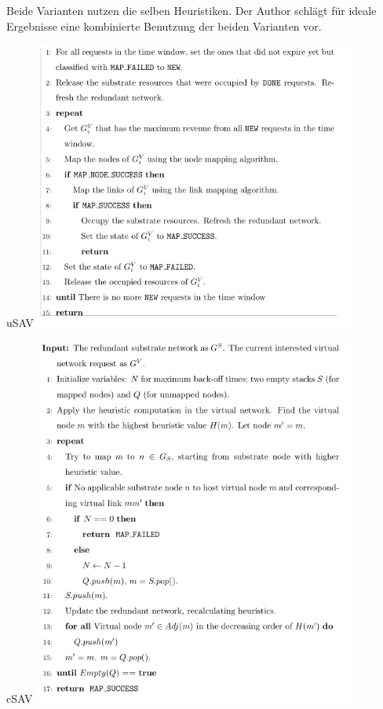 \documentclass{lni}
\begin{document}
Beide Varianten nutzen die selben Heuristiken. Der Author schlägt für ideale Ergebnisse eine kombinierte Benutzung der beiden Varianten vor.

\begin{center}
uSAV\newline
	\includegraphics[width=0.8\textwidth]{usav.pdf}\newline
\end{center}
\newpage
\begin{center}
cSAV\newline
	\includegraphics[width=0.8\textwidth]{csav.pdf}\newline
\end{center}
\end{document}
